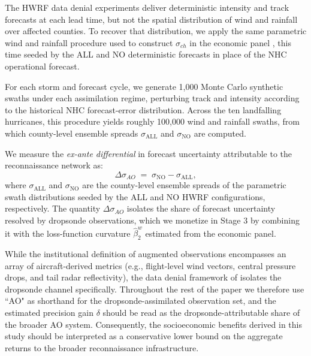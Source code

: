 \documentclass[12pt]{article}%
\begin{document}
The HWRF data denial experiments deliver deterministic intensity and track forecasts at each lead time, but not the spatial distribution of wind and rainfall over affected counties. To recover that distribution, we apply the same parametric wind and rainfall procedure used to construct $\sigma_{ch}$ in the economic panel \citep{lonfat2007parametric, willoughby2006parametric, knaff2007statistical}, this time seeded by the ALL and NO deterministic forecasts in place of the NHC operational forecast. 

For each storm and forecast cycle, we generate 1,000 Monte Carlo synthetic swaths under each assimilation regime, perturbing track and intensity according to the historical NHC forecast-error distribution. Across the ten landfalling hurricanes, this procedure yields roughly 100,000 wind and rainfall swaths, from which county-level ensemble spreads $\sigma_{\text{ALL}}$ and $\sigma_{\text{NO}}$ are computed.

We measure the \emph{ex-ante differential} in forecast uncertainty attributable to the reconnaissance network as:
\begin{equation}\label{eq:delta_sigma}
    \Delta \sigma_{AO} \;=\; \sigma_{\text{NO}} - \sigma_{\text{ALL}},
\end{equation}
where $\sigma_{\text{ALL}}$ and $\sigma_{\text{NO}}$ are the county-level ensemble spreads of the parametric swath distributions seeded by the ALL and NO HWRF configurations, respectively. The quantity $\Delta\sigma_{AO}$ isolates the share of forecast uncertainty resolved by dropsonde observations, which we monetize in Stage 3 by combining it with the loss-function curvature $\hat{\beta}^{w}_{2}$ estimated from the economic panel.

While the institutional definition of augmented observations encompasses an array of aircraft-derived metrics (e.g., flight-level wind vectors, central pressure drops, and tail radar reflectivity), the data denial framework of \citet{DitchekEA2023} isolates the dropsonde channel specifically. Throughout the rest of the paper we therefore use ``AO" as shorthand for the dropsonde-assimilated observation set, and the estimated precision gain $\delta$ should be read as the dropsonde-attributable share of the broader AO system. Consequently, the socioeconomic benefits derived in this study should be interpreted as a conservative lower bound on the aggregate returns to the broader reconnaissance infrastructure.

\end{document}

